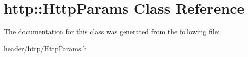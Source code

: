 \hypertarget{classhttp_1_1_http_params}{}\section{http\+:\+:Http\+Params Class Reference}
\label{classhttp_1_1_http_params}


The documentation for this class was generated from the following file\+:\begin{DoxyCompactItemize}
\item 
header/http/Http\+Params.\+h\end{DoxyCompactItemize}

